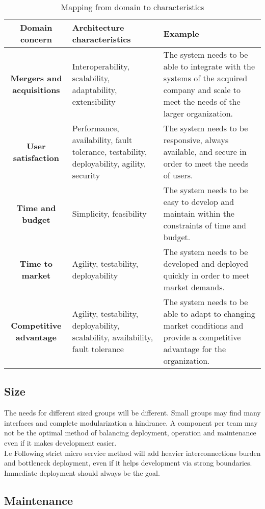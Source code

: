 \documentclass[11pt]{scrartcl} %
\begin{document}
\begin{table}
  \centering
  \begin{tabular}{|c|p{6cm}|p{6cm}|}
    \hline
    \textbf{Domain concern} & \textbf{Architecture characteristics} & \textbf{Example} \\ \hline
    \textbf{Mergers and acquisitions} & Interoperability, scalability, adaptability, extensibility & The system needs to be able to integrate with the systems of the acquired company and scale to meet the needs of the larger organization. \\ \hline
    \textbf{User satisfaction} & Performance, availability, fault tolerance, testability, deployability, agility, security & The system needs to be responsive, always available, and secure in order to meet the needs of users. \\ \hline
    \textbf{Time and budget} & Simplicity, feasibility & The system needs to be easy to develop and maintain within the constraints of time and budget. \\ \hline
    \textbf{Time to market} & Agility, testability, deployability & The system needs to be developed and deployed quickly in order to meet market demands. \\ \hline
    \textbf{Competitive advantage} & Agility, testability, deployability, scalability, availability, fault tolerance & The system needs to be able to adapt to changing market conditions and provide a competitive advantage for the organization. \\ \hline
    \end{tabular}
    \caption{Mapping from domain to characteristics}
\end{table}

\subsection{Size}

The needs for different sized groups will be different. Small groups may find many interfaces and 
complete modularization a hindrance. A component per team may not be the optimal method of balancing
deployment, operation and maintenance even if it makes development easier.\\

I.e Following strict micro service method will add heavier interconnections burden and bottleneck 
deployment, even if it helps development via strong boundaries. Immediate deployment should
always be the goal.

\subsection{Maintenance}
\end{document}
